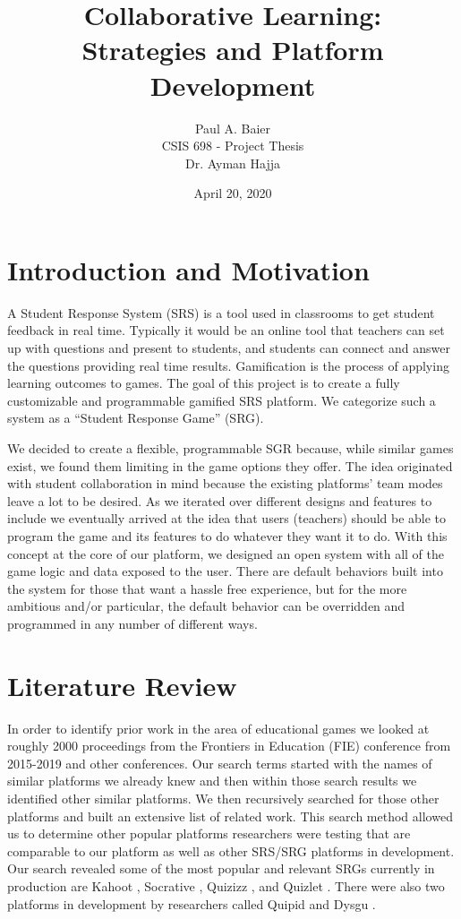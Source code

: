 \documentclass{article}
\title{Collaborative Learning: \\
    \normalsize Strategies and Platform Development
}
\author{Paul A. Baier \\ 
    \footnotesize CSIS 698 - Project Thesis \\
    \footnotesize Dr. Ayman Hajja
}
\date{April 20, 2020}
\begin{document}
\maketitle

\section{Introduction and Motivation}
    A Student Response System (SRS) is a tool used in classrooms to get student feedback in real time. Typically it would be an online tool that teachers can set up with questions and present to students, and students can connect and answer the questions providing real time results. Gamification is the process of applying learning outcomes to games. The goal of this project is to create a fully customizable and programmable gamified SRS platform. We categorize such a system as a ``Student Response Game'' (SRG).
    \smallskip

    We decided to create a flexible, programmable SGR because, while similar games exist, we found them limiting in the game options they offer. The idea originated with student collaboration in mind because the existing platforms' team modes leave a lot to be desired. As we iterated over different designs and features to include we eventually arrived at the idea that users (teachers) should be able to program the game and its features to do whatever they want it to do. With this concept at the core of our platform, we designed an open system with all of the game logic and data exposed to the user. There are default behaviors built into the system for those that want a hassle free experience, but for the more ambitious and/or particular, the default behavior can be overridden and programmed in any number of different ways.  

\section{Literature Review} \label{literature-review}
    In order to identify prior work in the area of educational games we looked at roughly 2000 proceedings from the Frontiers in Education (FIE) conference from 2015-2019 and other conferences. Our search terms started with the names of similar platforms we already knew and then within those search results we identified other similar platforms. We then recursively searched for those other platforms and built an extensive list of related work. This search method allowed us to determine other popular platforms researchers were testing that are comparable to our platform as well as other SRS/SRG platforms in development. Our search revealed some of the most popular and relevant SRGs currently in production are Kahoot \cite{kahoot}, Socrative \cite{socrative}, Quizizz \cite{quizizz}, and Quizlet \cite{quizlet}. There were also two platforms in development by researchers called Quipid \cite{quipid} and Dysgu \cite{dysgu}.
\end{document}
